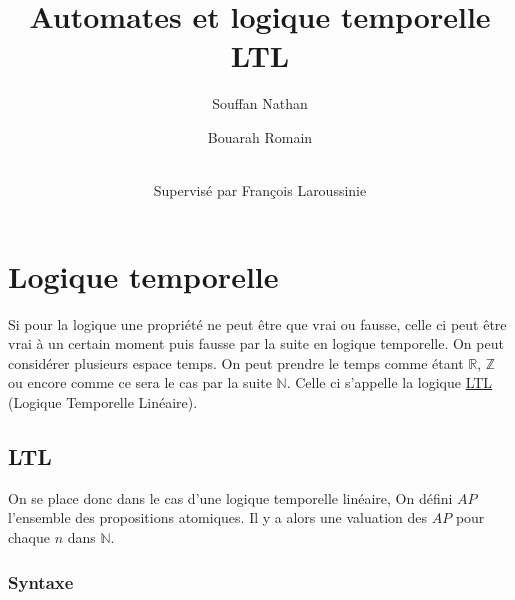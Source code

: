\documentclass[12pt,a4paper]{article}
\title {Automates et logique temporelle LTL}
\author{
  Souffan Nathan \and
  Bouarah Romain \and
  \\Supervisé par François Laroussinie
}
\begin{document}
\maketitle
\newpage

\section{Logique temporelle}

Si pour la logique une propriété ne peut être que vrai ou fausse, celle ci peut être vrai à un certain moment puis fausse par la suite en logique temporelle. On peut considérer plusieurs espace temps. On peut prendre le temps comme étant $\mathbb{R}$, $\mathbb{Z}$ ou encore comme ce sera le cas par la suite $\mathbb{N}$. Celle ci s'appelle la logique \underline{LTL} (Logique Temporelle Linéaire).

\subsection{LTL}
On se place donc dans le cas d'une logique temporelle linéaire, On défini $AP$ l'ensemble des propositions atomiques. Il y a alors une valuation des $AP$ pour chaque $n$ dans $\mathbb{N}$.

\subsubsection{Syntaxe}
\end{document}
